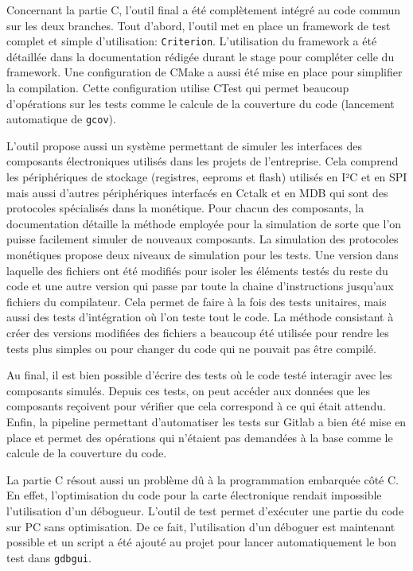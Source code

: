 \documentclass[a4paper]{article}
\begin{document}
Concernant la partie C, l'outil final a été complètement intégré au code commun
sur les deux branches. Tout d'abord, l'outil met en place un framework de test
complet et simple d'utilisation: \verb|Criterion|. L'utilisation du framework a
été détaillée dans la documentation rédigée durant le stage pour compléter celle
du framework. Une configuration de CMake a aussi été mise en place pour
simplifier la compilation. Cette configuration utilise CTest qui permet beaucoup
d'opérations sur les tests comme le calcule de la couverture du code (lancement
automatique de \verb|gcov|).

L'outil propose aussi un système permettant de simuler les interfaces des
composants électroniques utilisés dans les projets de l'entreprise. Cela
comprend les périphériques de stockage (registres, eeproms et flash) utilisés en
I²C et en SPI mais aussi d'autres périphériques interfacés en Cctalk et en MDB
qui sont des protocoles spécialisés dans la monétique. Pour chacun des
composants, la documentation détaille la méthode employée pour la simulation de
sorte que l'on puisse facilement simuler de nouveaux composants. La simulation
des protocoles monétiques propose deux niveaux de simulation pour les tests. Une
version dans laquelle des fichiers ont été modifiés pour isoler les éléments
testés du reste du code et une autre version qui passe par toute la chaine
d'instructions jusqu'aux fichiers du compilateur. Cela permet de faire à la fois
des tests unitaires, mais aussi des tests d'intégration où l'on teste tout le
code. La méthode consistant à créer des versions modifiées des fichiers a
beaucoup été utilisée pour rendre les tests plus simples ou pour changer du code
qui ne pouvait pas être compilé.

Au final, il est bien possible d'écrire des tests où le code testé interagir
avec les composants simulés. Depuis ces tests, on peut accéder aux données que
les composants reçoivent pour vérifier que cela correspond à ce qui était
attendu. Enfin, la pipeline permettant d'automatiser les tests sur Gitlab a bien
été mise en place et permet des opérations qui n'étaient pas demandées à la base
comme le calcule de la couverture du code.

La partie C résout aussi un problème dû à la programmation embarquée côté C. En
effet, l'optimisation du code pour la carte électronique rendait impossible
l'utilisation d'un débogueur. L'outil de test permet d'exécuter une partie du
code sur PC sans optimisation. De ce fait, l'utilisation d'un déboguer est
maintenant possible et un script a été ajouté au projet pour lancer
automatiquement le bon test dans \verb|gdbgui|.
\end{document}
